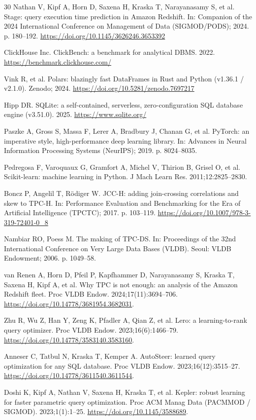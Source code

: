 \documentclass[10pt,a4paper]{article}
\begin{document}
{\begin{thebibliography}{30}
Nathan V, Kipf A, Horn D, Saxena H, Kraska T, Narayanasamy S, et al. Stage: query execution time prediction in Amazon Redshift. In: Companion of the 2024 International Conference on Management of Data (SIGMOD/PODS); 2024. p. 180--192. \url{https://doi.org/10.1145/3626246.3653392}

ClickHouse Inc. ClickBench: a benchmark for analytical DBMS. 2022. \url{https://benchmark.clickhouse.com/}

Vink R, et al. Polars: blazingly fast DataFrames in Rust and Python (v1.36.1 / v2.1.0). Zenodo; 2024. \url{https://doi.org/10.5281/zenodo.7697217}

Hipp DR. SQLite: a self-contained, serverless, zero-configuration SQL database engine (v3.51.0). 2025. \url{https://www.sqlite.org/}

Paszke A, Gross S, Massa F, Lerer A, Bradbury J, Chanan G, et al. PyTorch: an imperative style, high-performance deep learning library. In: Advances in Neural Information Processing Systems (NeurIPS); 2019. p. 8024--8035.

Pedregosa F, Varoquaux G, Gramfort A, Michel V, Thirion B, Grisel O, et al. Scikit-learn: machine learning in Python. J Mach Learn Res. 2011;12:2825--2830.

Boncz P, Angelil T, R{\"o}diger W. JCC-H: adding join-crossing correlations and skew to TPC-H. In: Performance Evaluation and Benchmarking for the Era of Artificial Intelligence (TPCTC); 2017. p. 103--119. \url{https://doi.org/10.1007/978-3-319-72401-0_8}

Nambiar RO, Poess M. The making of TPC-DS. In: Proceedings of the 32nd International Conference on Very Large Data Bases (VLDB). Seoul: VLDB Endowment; 2006. p. 1049--58.

van Renen A, Horn D, Pfeil P, Kapfhammer D, Narayanasamy S, Kraska T, Saxena H, Kipf A, et al. Why TPC is not enough: an analysis of the Amazon Redshift fleet. Proc VLDB Endow. 2024;17(11):3694--706. \url{https://doi.org/10.14778/3681954.3682031}.

Zhu R, Wu Z, Han Y, Zeng K, Pfadler A, Qian Z, et al. Lero: a learning-to-rank query optimizer. Proc VLDB Endow. 2023;16(6):1466--79. \url{https://doi.org/10.14778/3583140.3583160}.

Anneser C, Tatbul N, Kraska T, Kemper A. AutoSteer: learned query optimization for any SQL database. Proc VLDB Endow. 2023;16(12):3515--27. \url{https://doi.org/10.14778/3611540.3611544}.

Doshi K, Kipf A, Nathan V, Saxena H, Kraska T, et al. Kepler: robust learning for faster parametric query optimization. Proc ACM Manag Data (PACMMOD / SIGMOD). 2023;1(1):1--25. \url{https://doi.org/10.1145/3588689}.

\end{thebibliography}
}
\end{document}
